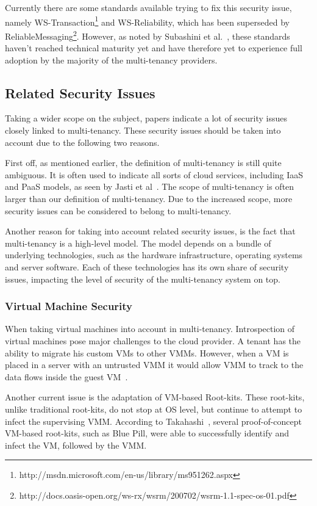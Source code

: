 Currently there are some standards available trying to fix this security issue, namely WS-Transaction\footnote{http://msdn.microsoft.com/en-us/library/ms951262.aspx} and WS-Reliability, which has been superseded by ReliableMessaging\footnote{http://docs.oasis-open.org/ws-rx/wsrm/200702/wsrm-1.1-spec-os-01.pdf}. 
However, as noted by Subashini et al.~\cite{Subashini2011Security}, these standards haven’t reached technical maturity yet and have therefore yet to experience full adoption by the majority of the multi-tenancy providers.

\subsection{Related Security Issues}
Taking a wider scope on the subject, papers indicate a lot of security issues closely linked to multi-tenancy. 
These security issues should be taken into account due to the following two reasons.

First off, as mentioned earlier, the definition of multi-tenancy is still quite ambiguous. 
It is often used to indicate all sorts of cloud services, including IaaS and PaaS models, as seen by Jasti et al~\cite{Jasti2010Security}. 
The scope of multi-tenancy is often larger than our definition of multi-tenancy. Due to the increased scope, more security issues can be considered to belong to multi-tenancy.

Another reason for taking into account related security issues, is the fact that multi-tenancy is a high-level model. 
The model depends on a bundle of underlying technologies, such as the hardware infrastructure, operating systems and server software. 
Each of these technologies has its own share of security issues, impacting the level of security of the multi-tenancy system on top. 

\subsubsection{Virtual Machine Security}
When taking virtual machines into account in multi-tenancy. 
Introspection of virtual machines pose major challenges to the cloud provider. 
A tenant has the ability to migrate his custom VMs to other VMMs. 
However, when a VM is placed in a server with an untrusted VMM it would allow VMM to track to the data flows inside the guest VM~\cite{Takahashi2012Security}.

Another current issue is the adaptation of VM-based Root-kits. 
These root-kits, unlike traditional root-kits, do not stop at OS level, but continue to attempt to infect the supervising VMM. 
According to Takahashi~\cite{Takahashi2012Security}, several proof-of-concept VM-based root-kits, such as Blue Pill, were able to successfully identify and infect the VM, followed by the VMM.

